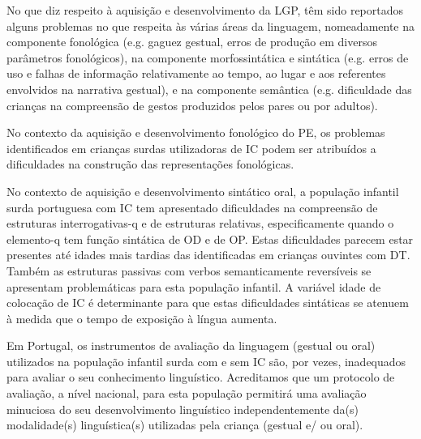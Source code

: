 \documentclass[output=paper,colorlinks,citecolor=brown,booklanguage=portuguese]{langscibook}
\begin{document}
No que diz respeito à aquisição e desenvolvimento da LGP, têm sido reportados alguns problemas no que respeita às várias áreas da linguagem, nomeadamente na componente fonológica (e.g. gaguez gestual, erros de produção em diversos parâmetros fonológicos), na componente morfossintática e sintática (e.g. erros de uso e falhas de informação relativamente ao tempo, ao lugar e aos referentes envolvidos na narrativa gestual), e na componente semântica (e.g. dificuldade das crianças na compreensão de gestos produzidos pelos pares ou por adultos).  

No contexto da aquisição e desenvolvimento fonológico do PE, os problemas identificados em crianças surdas utilizadoras de IC podem ser atribuídos a dificuldades na construção das representações fonológicas.

No contexto de aquisição e desenvolvimento sintático oral, a população infantil surda portuguesa com IC tem apresentado dificuldades na compreensão de estruturas interrogativas-q e de estruturas relativas, especificamente quando o elemento-q tem função sintática de OD e de OP. Estas dificuldades parecem estar presentes até idades mais tardias das identificadas em crianças ouvintes com DT. Também as estruturas passivas com verbos semanticamente reversíveis se apresentam problemáticas para esta população infantil. A variável idade de colocação de IC é determinante para que estas dificuldades sintáticas se atenuem à medida que o tempo de exposição à língua aumenta. 

Em Portugal, os instrumentos de avaliação da linguagem (gestual ou oral) utilizados na população infantil surda com e sem IC são, por vezes, inadequados para avaliar o seu conhecimento linguístico. Acreditamos que um protocolo de avaliação, a nível nacional, para esta população permitirá uma avaliação minuciosa do seu desenvolvimento linguístico independentemente da(s) modalidade(s) linguística(s) utilizadas pela criança (gestual e/ ou oral).


{\sloppy\printbibliography[heading=subbibliography,notkeyword=this]}
\end{document}
